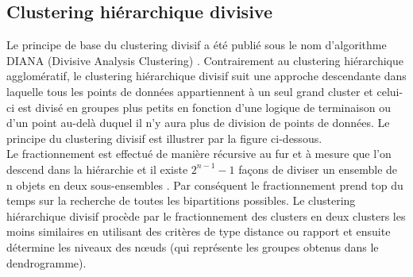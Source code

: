 \begin{figure}[H]
	\centering
    \qquad
\end{figure}


\subsection{Clustering hiérarchique divisive}
Le principe de base du clustering divisif a été publié sous le nom d'algorithme DIANA (Divisive Analysis Clustering) \cite{Finding_Groups_in_Data_An_Introduction_To_Cluster_Analysis}. Contrairement au clustering hiérarchique agglomératif, le clustering hiérarchique divisif suit une approche descendante dans laquelle tous les points de données appartiennent à un seul grand cluster et celui-ci est divisé en groupes plus petits en fonction d'une logique de terminaison ou d'un point au-delà duquel il n'y aura plus de division de points de données. Le principe du clustering divisif est illustrer par la figure ci-dessous. \\
Le fractionnement est effectué de manière récursive au fur et à mesure que l'on descend dans la hiérarchie et il existe \(\displaystyle 2^{n-1}-1 \) \cite{edwards1965method}  façons de diviser un ensemble de n objets en deux sous-ensembles \cite{roux2018comparative}. Par conséquent le fractionnement prend top du temps sur la recherche de toutes les bipartitions possibles. Le clustering hiérarchique divisif procède par le fractionnement des clusters en deux clusters les moins similaires en utilisant des critères de type distance ou rapport et ensuite détermine les niveaux des nœuds (qui représente les groupes obtenus dans le dendrogramme).


